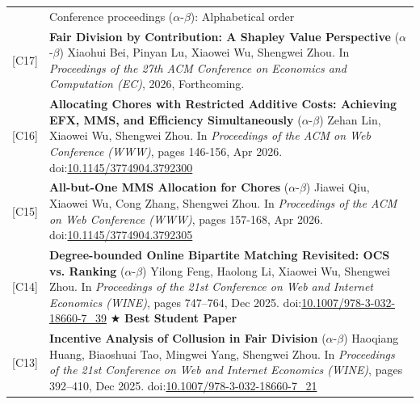 \documentclass[letterpaper, 11pt]{article}
\newcommand{\headingfont}{\Large\color{OliveGreen}}
\newenvironment{SectionTable}[1]{
	\renewcommand*{\arraystretch}{1.2}
	\setlength{\tabcolsep}{10pt}
	\begin{longtable}{Rp{5.2in}} & #1 \\}
{\end{longtable}\vspace{-1cm}}
\begin{document}
\begin{SectionTable}{\headingfont Conference proceedings \; \small\color{black}  ($\alpha$-$\beta$): Alphabetical order}

[C17] &
\textbf{Fair Division by Contribution: A Shapley Value Perspective} \newline
($\alpha$-$\beta$) Xiaohui Bei, Pinyan Lu, Xiaowei Wu, Shengwei Zhou.  \newline
In \textit{Proceedings of the 27th ACM Conference on Economics and Computation (EC)}, 2026, Forthcoming.\\

[C16] & 
\textbf{Allocating Chores with Restricted Additive Costs: Achieving EFX, MMS, and Efficiency Simultaneously} \newline
($\alpha$-$\beta$) Zehan Lin, Xiaowei Wu, Shengwei Zhou.  \newline
In \textit{Proceedings of the ACM on Web Conference (WWW)}, pages 146-156, Apr 2026. doi:\href{https://doi.org/10.1145/3774904.3792300}{10.1145/3774904.3792300}\\


[C15] & 
\textbf{All-but-One MMS Allocation for Chores} \newline
($\alpha$-$\beta$) Jiawei Qiu, Xiaowei Wu, Cong Zhang, Shengwei Zhou.  \newline
In \textit{Proceedings of the ACM on Web Conference (WWW)}, pages 157-168, Apr 2026. doi:\href{https://doi.org/10.1145/3774904.3792305}{10.1145/3774904.3792305} \\

[C14] & 
\textbf{Degree-bounded Online Bipartite Matching Revisited: OCS vs. Ranking} \newline
($\alpha$-$\beta$) Yilong Feng, Haolong Li, Xiaowei Wu, Shengwei Zhou. \newline
In \textit{Proceedings of the 21st Conference on Web and Internet Economics (WINE)}, pages 747--764, Dec 2025.
doi:\href{https://doi.org/10.1007/978-3-032-18660-7_39}{10.1007/978-3-032-18660-7\_39} $\bigstar$ \textbf{Best Student Paper} \\

[C13] & 
\textbf{Incentive Analysis of Collusion in Fair Division} \newline
($\alpha$-$\beta$) Haoqiang Huang, Biaoshuai Tao, Mingwei Yang, Shengwei Zhou. \newline
In \textit{Proceedings of the 21st Conference on Web and Internet Economics (WINE)}, pages 392--410, Dec 2025.
doi:\href{https://doi.org/10.1007/978-3-032-18660-7_21}{10.1007/978-3-032-18660-7\_21}\\


\end{SectionTable}
\end{document}
